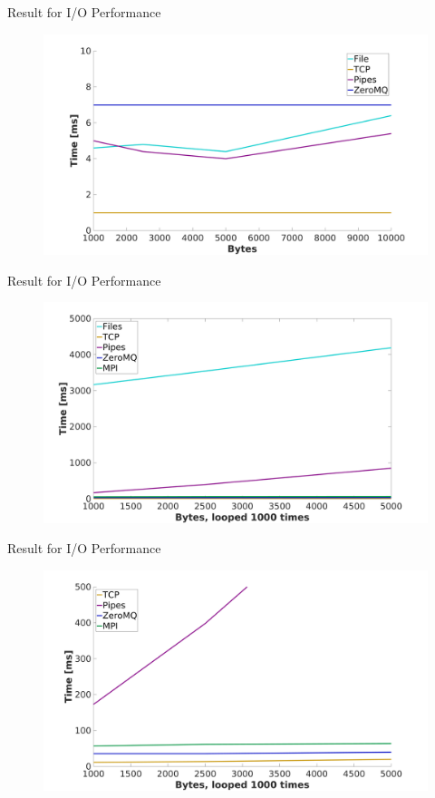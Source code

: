 \documentclass{beamer}
\begin{document}
    \begin{frame}{Result for I/O Performance}
    \begin{figure}[h!]
        \centering
        \includegraphics[width=1\columnwidth]{singlerun-nf}
    \end{figure}
    \end{frame}
    \begin{frame}{Result for I/O Performance}
    \begin{figure}[h!]
        \centering
        \includegraphics[width=1\columnwidth]{thousandrun+files-nf}
    \end{figure}
    \end{frame}
    \begin{frame}{Result for I/O Performance}
    \begin{figure}[h!]
        \centering
        \includegraphics[width=1\columnwidth]{thousandrun-nf}
    \end{figure}
    \end{frame}
\end{document}
